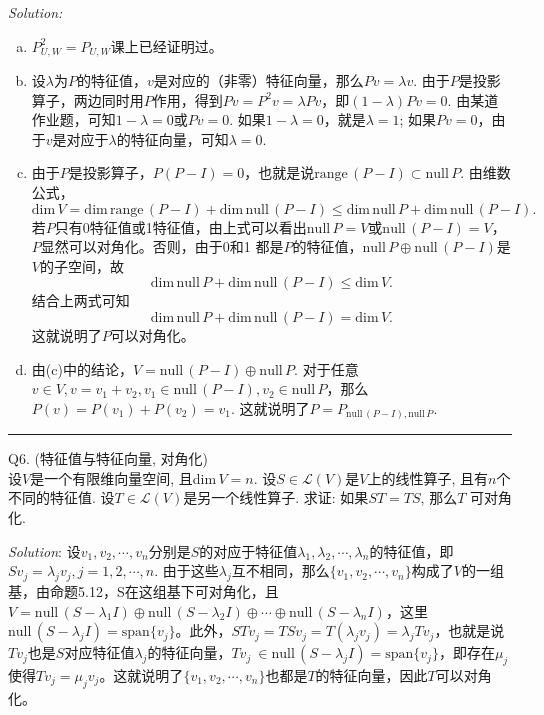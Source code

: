 \documentclass[a4[paper]{article}
\newcommand\spa{\mathrm{span}}  %
\def\Null{\mathrm{null}\,}
\begin{document}
\noindent{} \emph{Solution:}
\begin{enumerate}[(a).]
\item $P_{U,W}^2 = P_{U,W}$课上已经证明过。

\item 设$\lambda$为$P$的特征值，$v$是对应的（非零）特征向量，那么$Pv=\lambda v$. 由于$P$是投影算子，两边同时用$P$作用，得到$Pv = P^2v=\lambda Pv$，即$(1-\lambda) Pv=0$. 由某道作业题，可知$1-\lambda=0$或$Pv=0$. 如果$1-\lambda=0$，就是$\lambda=1$; 如果$Pv=0$，由于$v$是对应于$\lambda$的特征向量，可知$\lambda=0$.

\item 由于$P$是投影算子，$P(P-I)=0$，也就是说$\mathrm{range}\, (P-I) \subset \mathrm{null}\, P$. 由维数公式，
\[\mathrm{dim}\, V = \mathrm{dim}\, \mathrm{range}\,(P-I)+\mathrm{dim}\,\mathrm{null}\,(P-I)\le \mathrm{dim}\, \mathrm{null}\,P+\mathrm{dim}\,\mathrm{null}\,(P-I).\]
若$P$只有0特征值或1特征值，由上式可以看出$\mathrm{null}\,P=V$或$\mathrm{null}\,(P-I)=V$，$P$显然可以对角化。否则，由于0和1 都是$P$的特征值，$\mathrm{null}\,P \oplus \mathrm{null}\,(P-I)$是$V$的子空间，故
\[\mathrm{dim}\, \mathrm{null}\,P+\mathrm{dim}\,\mathrm{null}\,(P-I)\le\mathrm{dim}\, V.\]
结合上两式可知
\[\mathrm{dim}\, \mathrm{null}\,P+\mathrm{dim}\,\mathrm{null}\,(P-I)=\mathrm{dim}\, V.\]
这就说明了$P$可以对角化。

\item 由(c)中的结论，$V =  \mathrm{null}\,(P-I)\oplus  \mathrm{null}\,P$. 对于任意$v\in V, v= v_1+v_2, v_1\in  \mathrm{null}\,(P-I), v_2 \in  \mathrm{null}\,P$，那么$P(v)=P(v_1)+P(v_2)=v_1$. 这就说明了$P = P_{ \mathrm{null}\,(P-I), \mathrm{null}\,P}$.
\end{enumerate}

\bigskip
\noindent{}\rule{\textwidth}{0.1mm}
\bigskip
	
\noindent{} Q6. (特征值与特征向量, 对角化)\\
	设$V$是一个有限维向量空间, 且dim$\,V = n$. 设$S \in \mathcal{L}(V)$是$V$上的线性算子, 且有$n$个不同的特征值. 设$T \in \mathcal{L}(V)$是另一个线性算子. 求证: 如果$ST = TS$, 那么$T$ 可对角化.

\bigskip

\noindent{}\emph{Solution}:
	设$v_1,v_2,\cdots,v_n$分别是$S$的对应于特征值$\lambda_1,\lambda_2,\cdots,\lambda_n$的特征值，即$Sv_j=\lambda_j v_j,j=1,2,\cdots,n$. 由于这些$\lambda_j$互不相同，那么$\{v_1,v_2,\cdots,v_n\}$构成了$V$的一组基，由命题5.12，S在这组基下可对角化，且$V=\Null(S-\lambda_1 I)\oplus \Null(S-\lambda_2 I)\oplus\cdots\oplus \Null(S-\lambda_n I)$，这里$\Null(S-\lambda_j I) = \spa\{v_j\}$。此外，$STv_j = TSv_j = T(\lambda_j v_j) = \lambda_j Tv_j$，也就是说$Tv_j$也是$S$对应特征值$\lambda_j$的特征向量，$Tv_j\ \in \Null(S-\lambda_j I)=\spa\{v_j\}$，即存在$\mu_j$ 使得$ Tv_j = \mu_j v_j$。这就说明了$\{v_1,v_2,\cdots,v_n\}$也都是$T$的特征向量，因此$T$可以对角化。
\end{document}
